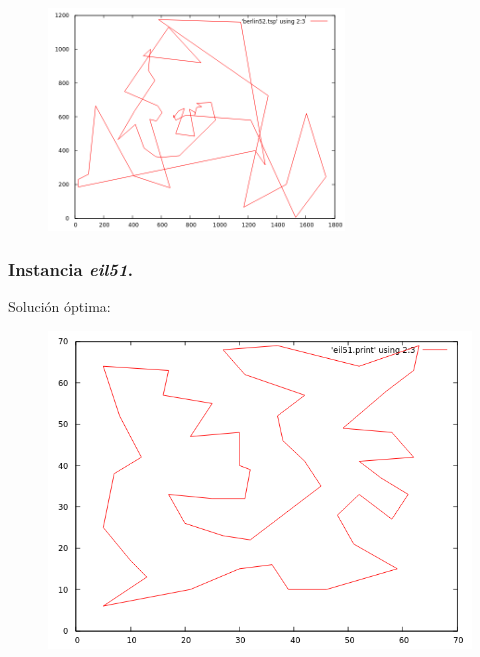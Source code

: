 \documentclass[11pt,a4paper]{article}
\begin{document}
				\begin{figure}[h]

					\centering
					\includegraphics[width=0.7\textwidth]{berlin52IR.png}
					
				\end{figure}

\newpage

			\subsubsection{Instancia \textit{eil51}.}

				\par
				Solución óptima:

				\vspace{5mm}

				\begin{figure}[h]

					\centering
					\includegraphics[width=1\textwidth]{eil51OPT.png}
					
				\end{figure}
\end{document}
